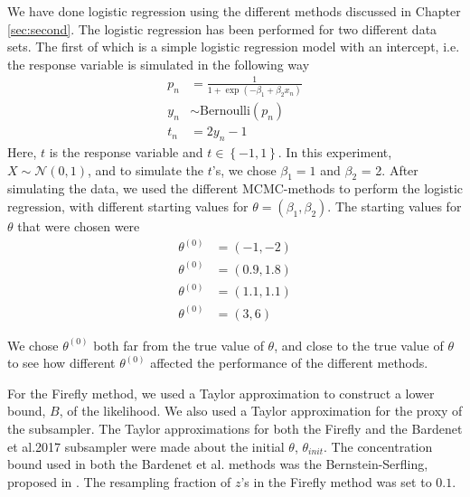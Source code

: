  We have done logistic regression using the different methods discussed in Chapter \ref{sec:second}. The logistic regression has been performed for two different data sets. The first of which is a simple logistic regression model with an intercept, i.e. the response variable is simulated in the following way 
 \begin{equation}\begin{split}
     p_n &= \frac{1}{1 + \exp(- \beta_1 + \beta_2 x_n )}
     \\ y_n &\sim \text{Bernoulli}(p_n) 
     \\ t_n &= 2y_n -1
     \end{split}
 \end{equation}
 Here, $t$ is the response variable and $t \in \left\{-1, 1\right\}$. 
 In this experiment, $X \sim \mathcal{N}\left(0,1\right)$, and to simulate the $t$'s, we chose $\beta_1 = 1$ and $\beta_2$ = 2. After simulating the data, we used the different MCMC-methods to perform the logistic regression, with different starting values for $\theta = \left(\beta_1, \beta_2\right)$. The starting values for $\theta$ that were chosen were 
 \begin{equation*}
 \begin{split}
     \theta^{\left(0\right)} &= \left(-1, -2\right) \\
     \theta^{\left(0\right)} &= \left(0.9, 1.8\right) \\
     \theta^{\left(0\right)} & = \left(1.1, 1.1\right) \\
     \theta^{\left(0\right)} &= \left(3, 6\right) 
 \end{split}
 \end{equation*} 
 
 We chose $\theta^{\left(0\right)}$ both far from the true value of $\theta$, and close to the true value of $\theta$ to see how different $\theta^{\left(0\right)}$ affected the performance of the different methods. 
 
 
 For the Firefly method, we used a Taylor approximation to construct a lower bound, $B$, of the likelihood. We also used a Taylor approximation for the proxy of the \cite{Bardenet:1} subsampler. The Taylor approximations for both the Firefly and the Bardenet et al.2017 subsampler were made about the initial $\theta$, $\theta_{init}$.  The concentration bound used in both the Bardenet et al. methods was the Bernstein-Serfling, proposed in \cite{bardenet2015concentration}.  The resampling fraction of $z$'s in the Firefly method was set to $0.1$. 
 
